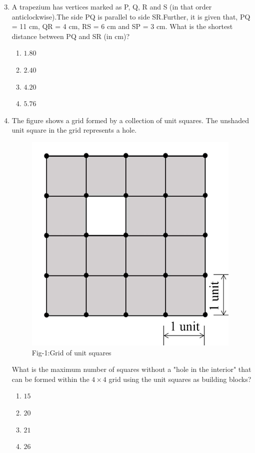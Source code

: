 \documentclass[journal]{IEEEtran}
\theoremstyle{remark}
\begin{document}
\begin{enumerate}[itemsep=1em]
\setcounter{enumi}{2}
\item A trapezium has vertices marked as P, Q, R and S (in that order anticlockwise).The side PQ is parallel to side SR.Further, it is given that, PQ = 11 cm, QR = 4 cm, RS = 6 cm and SP = 3 cm. What is the shortest distance between PQ and SR (in cm)? 
\begin{multicols}{4}
\begin{enumerate}
    \item $1.80$
    \item $2.40$
    \item $4.20$
    \item $5.76$
\end{enumerate}
\end{multicols}
\end{enumerate}

\begin{enumerate}[itemsep=1em]
\setcounter{enumi}{3}
\item The figure shows a grid formed by a collection of unit squares. The unshaded unit square in the grid represents a hole.
\begin{figure}[H]
    \centering
    \includegraphics[width=0.3\columnwidth]{figs/fig-1.jpeg}
    \caption*{Fig-1:Grid of unit squares}
    \label{fig-1}
\end{figure}
What is the maximum number of squares without a "hole in the interior" that can be formed within the $4\times4$ grid using the unit squares as building blocks?
\newpage
\vspace*{0.25cm}
\begin{multicols}{4}
\begin{enumerate}
    \item $15$
    \item $20$
    \item $21$
    \item $26$
\end{enumerate}
\end{multicols}
\end{enumerate}
\end{document}
